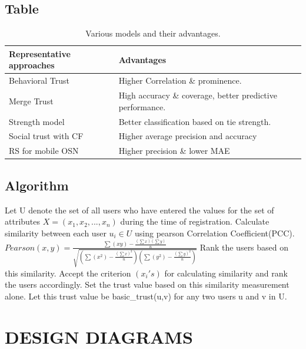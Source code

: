 \documentclass[12pt,a4paper]{report}
\begin{document}
\section{Table}
\begin{table}[h!]
\centering
\caption{Various models and their advantages.}
\label{my-label}
\begin{tabular}{||l|l||}
\hline
\textbf{ Representative approaches }& \textbf{Advantages }   \\
 \hline \hline
 Behavioral Trust   &   Higher Correlation \& prominence.   \\
 \hline
 Merge Trust &   High accuracy \& coverage, better predictive performance.   \\
\hline
  Strength model &  Better classification based on tie strength.  \\
  \hline
  Social trust with CF & Higher average precision and accuracy\\
\hline  
  RS for mobile OSN & Higher precision \& lower MAE\\
  \hline
\end{tabular}
\end{table}

\section{Algorithm}

\begin{algorithm}
\caption{Initializing users}\label{euclid}
\begin{algorithmic}[1]
\State Let U denote the set of all users who have entered the values for the set of attributes $X=(x_1,x_2,...,x_n)$ during the time of registration.
\State Calculate similarity between each user $u_i \in U$ using pearson Correlation Coefficient(PCC).
$Pearson (x,y) = \frac{\sum {(xy)} − \frac{(\sum{x})(\sum{y})}{n}}  {\sqrt{(\sum{({x}^{2})} - \frac{{(\sum{x})}^{2}}{n}) (\sum {({y}^{2})} - \frac{{(\sum{y})}^{2}}{n})}} $
\State Rank the users based on this similarity.
\State Accept the criterion $(x_i's)$ for calculating similarity and rank the users accordingly.
\State Set the trust value based on this similarity measurement alone. Let this trust value be
basic\_trust(u,v) for any two users u and v in U.

\EndProcedure
\end{algorithmic}
\end{algorithm}


\chapter{DESIGN DIAGRAMS}
\thispagestyle{fancy}
\onehalfspacing
\end{document}
